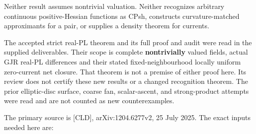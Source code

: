 \documentclass[
  11pt,
]{article}
\begin{document}
Neither result assumes nontrivial valuation. Neither recognizes
arbitrary continuous positive-Hessian functions as CPsh, constructs
curvature-matched approximants for a pair, or supplies a density theorem
for currents.

The accepted strict real-PL theorem and its full proof and audit were
read in the supplied deliverables. Their scope is complete
\textbf{nontrivially} valued fields, actual GJR real-PL differences and
their stated fixed-neighbourhood locally uniform zero-current net
closure. That theorem is not a premise of either proof here. Its review
does not certify these new results or a changed recognition theorem. The
prior elliptic-disc surface, coarse fan, scalar-ascent, and
strong-product attempts were read and are not counted as new
counterexamples.

The primary source is {[}CLD{]}, arXiv:1204.6277v2, 25 July 2025. The
exact inputs needed here are:
\end{document}
